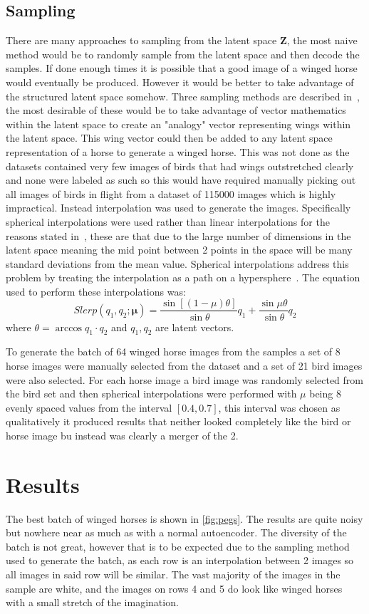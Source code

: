 \documentclass{article}
\begin{document}
\subsection{Sampling}
There are many approaches to sampling from the latent space $\bm{Z}$, the most naive method would be to randomly sample from the latent space and then decode the samples. If done enough times it is possible that a good image of a winged horse would eventually be produced. However it would be better to take advantage of the structured latent space somehow. Three sampling methods are described in~\cite{sampl}, the most desirable of these would be to take advantage of vector mathematics within the latent space to create an "analogy" vector representing wings within the latent space. This wing vector could then be added to any latent space representation of a horse to generate a winged horse. This was not done as the datasets contained very few images of birds that had wings outstretched clearly and none were labeled as such so this would have required manually picking out all images of birds in flight from a dataset of 115000 images which is highly impractical. Instead interpolation was used to generate the images. Specifically spherical interpolations were used rather than linear interpolations for the reasons stated in~\cite{sampl}, these are that due to the large number of dimensions in the latent space meaning the mid point between 2 points in the space will be many standard deviations from the mean value. Spherical interpolations address this problem by treating the interpolation as a path on a hypersphere~\cite{sampl}. The equation used to perform these interpolations was:
\begin{equation}
    Slerp(q_1,q_2;\bm{\mu})=\frac{\sin[(1-\mu)\theta]}
    {\sin\theta}q_1+
    \frac{\sin\mu\theta}
    {\sin\theta}q_2
\end{equation}
where $\theta=\arccos{q_1\cdot q_2}$ and $q_1, q_2$ are latent vectors.
\par
To generate the batch of 64 winged horse images from the samples a set of 8 horse images were manually selected from the dataset and a set of 21 bird images were also selected. For each horse image a bird image was randomly selected from the bird set and then spherical interpolations were performed with $\mu$ being 8 evenly spaced values from the interval $[0.4, 0.7]$, this interval was chosen as qualitatively it produced results that neither looked completely like the bird or horse image bu instead was clearly a merger of the 2.
\section{Results}
The best batch of winged horses is shown in \autoref{fig:pegs}. The results are quite noisy but nowhere near as much as with a normal autoencoder. The diversity of the batch is not great, however that is to be expected due to the sampling method used to generate the batch, as each row is an interpolation between 2 images so all images in said row will be similar. The vast majority of the images in the sample are white, and the images on rows 4 and 5 do look like winged horses with a small stretch of the imagination.
\end{document}
